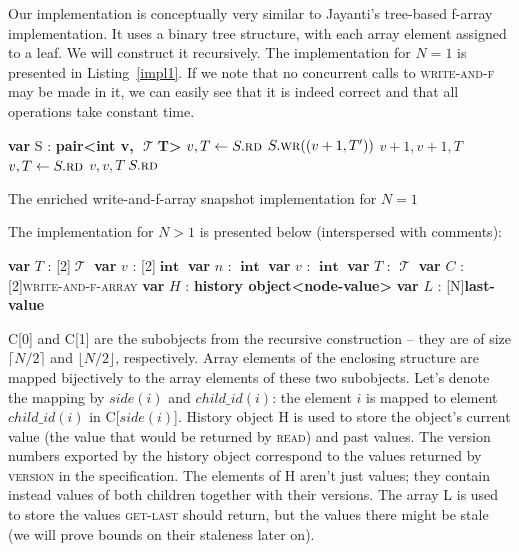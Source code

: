 \documentclass[a4paper,11pt]{article}
\def\T{\ensuremath{\operatorname{\mathcal{T}}}\text{ }}
\def\int{\ensuremath{\operatorname{\textbf{int}}}}
\newcommand{\fn}[1]{\textsc{#1}}
\newcommand{\var}[2]{\textbf{var }#1 : #2}
\newcommand{\arrayspec}[1]{\text{array}[#1]\text{ of }}
\begin{document}
Our implementation is conceptually very similar to Jayanti's tree-based f-array implementation. It uses a binary tree structure, with each array element assigned to a leaf.
We will construct it recursively. The implementation for $N = 1$ is presented in Listing~\ref{impl1}. If we note that no concurrent calls to \fn{write-and-f} may be made in it, we can easily
see that it is indeed correct and that all operations take constant time.

\begin{Listing}[!h]
\begin{algorithmic}[1]
	\State\var{S}{\textbf{pair<int v, \T T>}} %
		\State $v, T \gets S.\fn{rd}$
		\State $S.\fn{wr}((v + 1, T'))$
		\State \Return $v + 1, v + 1, T$
	\EndFunction
		\State $v, T \gets S.\fn{rd}$
		\State \Return $v, v, T$
	\EndFunction
		\State \Return $S.\fn{rd}$
	\EndFunction
\end{algorithmic}
\caption{The enriched write-and-f-array snapshot implementation for $N=1$}
\label{impl1}
\end{Listing}
\FloatBarrier

The implementation for $N > 1$ is presented below (interspersed with comments):
\begin{algorithmic}[1]
		\State \var{$T$}{\arrayspec{2}\T} 
		\State \var{$v$}{\arrayspec{2}\int} 
	\EndStruct
		\State \var{$n$}{\int}
		\State \var{$v$}{\int}
		\State \var{$T$}{\T}
	\EndStruct
	\State \var{$C$}{\arrayspec{2}\textsc{write-and-f-array}}  
	\State \var{$H$}{\textbf{history object<node-value>}} 
	\State \var{$L$}{\arrayspec{N}\textbf{last-value}} %
\end{algorithmic}

C[0] and C[1] are the subobjects from the recursive construction -- they are of size $\lceil{}N/2\rceil{}$ and $\lfloor{}N/2\rfloor{}$, respectively. Array elements of the enclosing
structure are mapped bijectively to the array elements of these two subobjects. Let's denote the mapping by $side(i)$ and $child\_id(i)$: the element $i$ is mapped to element $child\_id(i)$ in C[$side(i)$].
History object H is used to store the object's current value (the value that would be returned by \fn{read}) and past values. The version numbers exported by the history object correspond to the values returned by \fn{version}
in the specification. The elements of H aren't just values; they contain instead values of both children together with their versions.
The array L is used to store the values \fn{get-last} should return, but the values there might be stale (we will prove bounds on their staleness later on).
\end{document}
